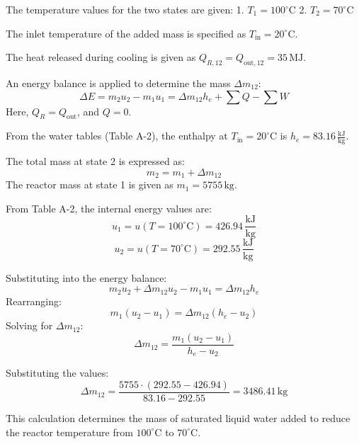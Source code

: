 The temperature values for the two states are given:  
1. \( T_1 = 100^\circ\text{C} \)  
2. \( T_2 = 70^\circ\text{C} \)  

The inlet temperature of the added mass is specified as \( T_{\text{in}} = 20^\circ\text{C} \).  

The heat released during cooling is given as \( Q_{R,12} = Q_{\text{out},12} = 35 \, \text{MJ} \).  

An energy balance is applied to determine the mass \( \Delta m_{12} \):  
\[
\Delta E = m_2 u_2 - m_1 u_1 = \Delta m_{12} h_e + \sum Q - \sum W
\]  
Here, \( Q_R = Q_{\text{out}} \), and \( Q = 0 \).  

From the water tables (Table A-2), the enthalpy at \( T_{\text{in}} = 20^\circ\text{C} \) is \( h_e = 83.16 \, \frac{\text{kJ}}{\text{kg}} \).  

The total mass at state 2 is expressed as:  
\[
m_2 = m_1 + \Delta m_{12}
\]  
The reactor mass at state 1 is given as \( m_1 = 5755 \, \text{kg} \).  

From Table A-2, the internal energy values are:  
\[
u_1 = u(T = 100^\circ\text{C}) = 426.94 \, \frac{\text{kJ}}{\text{kg}}
\]  
\[
u_2 = u(T = 70^\circ\text{C}) = 292.55 \, \frac{\text{kJ}}{\text{kg}}
\]  

Substituting into the energy balance:  
\[
m_2 u_2 + \Delta m_{12} u_2 - m_1 u_1 = \Delta m_{12} h_e
\]  
Rearranging:  
\[
m_1 (u_2 - u_1) = \Delta m_{12} (h_e - u_2)
\]  
Solving for \( \Delta m_{12} \):  
\[
\Delta m_{12} = \frac{m_1 (u_2 - u_1)}{h_e - u_2}
\]  

Substituting the values:  
\[
\Delta m_{12} = \frac{5755 \cdot (292.55 - 426.94)}{83.16 - 292.55} = 3486.41 \, \text{kg}
\]  

This calculation determines the mass of saturated liquid water added to reduce the reactor temperature from \( 100^\circ\text{C} \) to \( 70^\circ\text{C} \).
